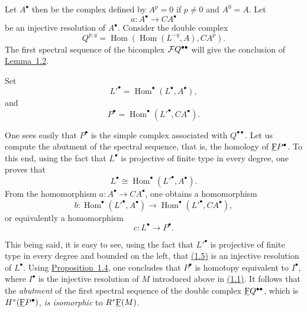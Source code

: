
\renewcommand{\theequation}{1.\arabic{equation}}\setcounter{equation}{1}

Let $A^\bullet$ then be the complex defined by $A^p=0$ if $p\ne 0$ and
$A^0=A$. Let
\[
  a\colon A^\bullet\longrightarrow CA^\bullet
\]
be an injective resolution of $A^\bullet$. Consider the double complex
\begin{equation}\label{eq:VIII.1.2}
  Q^{p,q}=\operatorname{Hom}(\operatorname{Hom}(L^{-q},A),CA^p).
\end{equation}
The first spectral sequence of the bicomplex $\cF Q^{\bullet\bullet}$ will
give the conclusion of \hyperref[VIII.1.2]{Lemma~1.2}.

Set
\begin{equation}\label{eq:VIII.1.3}
  {L'}^\bullet=\operatorname{Hom}^\bullet(L^\bullet,A^\bullet),
\end{equation}
and
\begin{equation}\label{eq:VIII.1.4}
  P^\bullet=\operatorname{Hom}^\bullet({L'}^\bullet,CA^\bullet).
\end{equation}


\renewcommand{\theequation}{1.\arabic{equation}}\setcounter{equation}{4}

One sees easily that $P^\bullet$ is the simple complex associated with
$Q^{\bullet\bullet}$. Let us compute the abutment of the spectral sequence,
that is, the homology of $\underline{\mathrm F} P^\bullet$. To this end, using the fact that
$L^\bullet$ is projective of finite type in every degree, one proves that
\[
  L^\bullet \cong \operatorname{Hom}^\bullet({L'}^\bullet,A^\bullet).
\]
From the homomorphism $a\colon A^\bullet\to CA^\bullet$, one obtains a
homomorphism
\[
  b\colon \operatorname{Hom}^\bullet({L'}^\bullet,A^\bullet)
  \longrightarrow \operatorname{Hom}^\bullet({L'}^\bullet,CA^\bullet),
\]
or equivalently a homomorphism
\begin{equation}\label{eq:VIII.1.5}
  c\colon L^\bullet\longrightarrow P^\bullet.
\end{equation}

This being said, it is easy to see, using the fact that ${L'}^\bullet$ is
projective of finite type in every degree and bounded on the left, that
\hyperref[eq:VIII.1.5]{(1.5)} is an injective resolution of $L^\bullet$. Using \hyperref[VIII.1.4]{Proposition~1.4}, one
concludes that $P^\bullet$ is homotopy equivalent to $I^\bullet$, where
$I^\bullet$ is the injective resolution of $M$ introduced above in \hyperref[eq:VIII.1.1]{(1.1)}.
It follows that the \emph{abutment} of the first spectral sequence of the
double complex $\underline{\mathrm F} Q^{\bullet\bullet}$, which is
$H^*(\underline{\mathrm F} P^\bullet)$, \emph{is isomorphic} to $R^*\underline{\mathrm F}(M)$.

